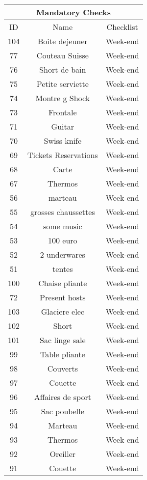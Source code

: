 \begin{longtable}{|c|c|c|}
\hline
\multicolumn{3}{|c|}{Mandatory Checks} \\
\hline
ID & Name & Checklist\\
\hline
104 & Boite dejeuner & Week-end\\
\hline
77 & Couteau Suisse & Week-end\\
\hline
76 & Short de bain & Week-end\\
\hline
75 & Petite serviette & Week-end\\
\hline
74 & Montre g Shock & Week-end\\
\hline
73 & Frontale & Week-end\\
\hline
71 & Guitar & Week-end\\
\hline
70 & Swiss knife & Week-end\\
\hline
69 & Tickets Reservations & Week-end\\
\hline
68 & Carte & Week-end\\
\hline
67 & Thermos & Week-end\\
\hline
56 & marteau & Week-end\\
\hline
55 & grosses chaussettes & Week-end\\
\hline
54 & some music & Week-end\\
\hline
53 & 100 euro & Week-end\\
\hline
52 & 2 underwares & Week-end\\
\hline
51 & tentes & Week-end\\
\hline
100 & Chaise pliante & Week-end\\
\hline
72 & Present hosts & Week-end\\
\hline
103 & Glaciere elec & Week-end\\
\hline
102 & Short & Week-end\\
\hline
101 & Sac linge sale & Week-end\\
\hline
99 & Table pliante & Week-end\\
\hline
98 & Couverts & Week-end\\
\hline
97 & Couette & Week-end\\
\hline
96 & Affaires de sport & Week-end\\
\hline
95 & Sac poubelle & Week-end\\
\hline
94 & Marteau & Week-end\\
\hline
93 & Thermos & Week-end\\
\hline
92 & Oreiller & Week-end\\
\hline
91 & Couette & Week-end\\

\end{longtable}
